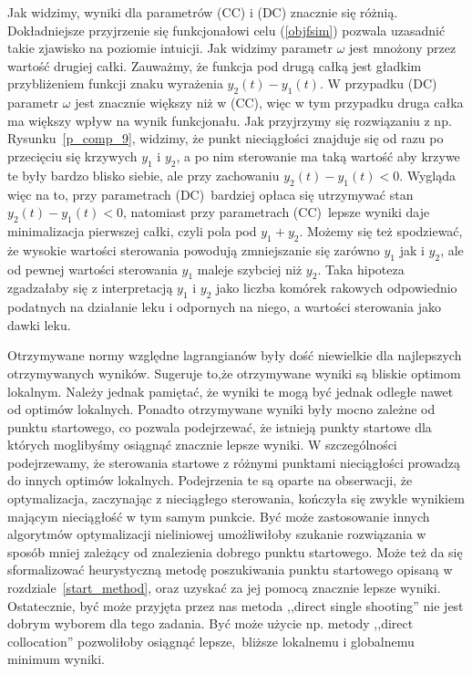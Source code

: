 \documentclass[licencjacka]{pracamgr}
\begin{document}
Jak widzimy, wyniki dla parametrów (CC) i (DC) znacznie się różnią. Dokładniejsze przyjrzenie się funkcjonałowi celu (\ref{objfsim}) pozwala uzasadnić takie zjawisko na poziomie intuicji. Jak widzimy parametr $\omega$ jest mnożony przez wartość drugiej całki. Zauważmy, że funkcja pod drugą całką jest gładkim przybliżeniem funkcji znaku wyrażenia $y_2(t) - y_1(t)$. W przypadku (DC) parametr $\omega$ jest znacznie większy niż w (CC), więc w tym przypadku druga całka ma większy wpływ na wynik funkcjonału. Jak przyjrzymy się rozwiązaniu z np. Rysunku~\ref{p_comp_9}, widzimy, że punkt nieciągłości znajduje się od razu po przecięciu się krzywych $y_1$ i $y_2$, a po nim sterowanie ma taką wartość aby krzywe te były bardzo blisko siebie, ale przy zachowaniu $y_2(t) - y_1(t) < 0$. Wygląda więc na to, przy parametrach (DC)\ bardziej opłaca się utrzymywać stan $y_2(t) - y_1(t) < 0$, natomiast przy parametrach (CC)\ lepsze wyniki daje minimalizacja pierwszej całki, czyli pola pod $y_1 + y_2$. Możemy się też spodziewać, że wysokie wartości sterowania powodują zmniejszanie się zarówno $y_1$ jak i $y_2$, ale od pewnej wartości sterowania $y_1$ maleje szybciej niż $y_2$. Taka hipoteza zgadzałaby się z interpretacją $y_1$ i $y_2$ jako liczba komórek rakowych odpowiednio podatnych na działanie leku i odpornych na niego, a wartości sterowania jako dawki leku.

Otrzymywane normy względne lagrangianów były dość niewielkie dla najlepszych otrzymywanych wyników. Sugeruje to,że otrzymywane wyniki są bliskie optimom lokalnym. Należy jednak pamiętać, że wyniki te mogą być jednak odległe nawet od optimów lokalnych. Ponadto otrzymywane wyniki były mocno zależne od punktu startowego, co pozwala podejrzewać, że istnieją punkty startowe dla których moglibyśmy osiągnąć znacznie lepsze wyniki. W szczególności podejrzewamy, że sterowania startowe z różnymi punktami nieciągłości prowadzą do innych optimów lokalnych. Podejrzenia te są oparte na obserwacji, że optymalizacja, zaczynając z nieciągłego sterowania, kończyła się zwykle wynikiem mającym nieciągłość w tym samym punkcie. Być może zastosowanie innych algorytmów optymalizacji nieliniowej umożliwiłoby szukanie rozwiązania w sposób mniej zależący od znalezienia dobrego punktu startowego. Może też da się sformalizować heurystyczną metodę poszukiwania punktu startowego opisaną w rozdziale~\ref{start_method}, oraz uzyskać za jej pomocą znacznie lepsze wyniki. Ostatecznie, być może przyjęta przez nas metoda ,,direct single shooting'' nie jest dobrym wyborem dla tego zadania. Być może użycie np. metody ,,direct collocation'' pozwoliłoby osiągnąć lepsze,\ bliższe lokalnemu i globalnemu minimum wyniki.
\end{document}
